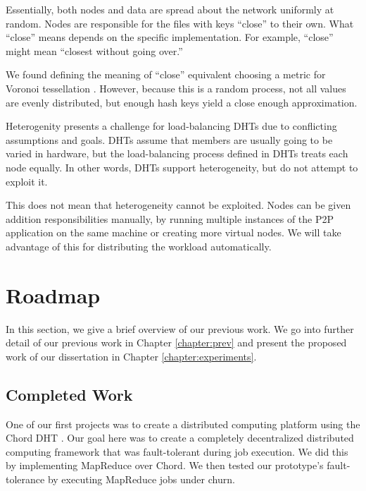 Essentially, both nodes and data are spread about the network uniformly at random.
Nodes are responsible for the files with keys ``close'' to their own.
What ``close'' means depends on the specific implementation.
For example, ``close'' might mean ``closest without going over.''
 
We found defining the meaning of ``close'' equivalent choosing a metric for Voronoi tessellation \cite{vhash}.
However, because this is a random process, not all values are evenly distributed, but enough hash keys yield a close enough approximation.

Heterogenity presents a challenge for load-balancing DHTs due to conflicting assumptions and goals. 
DHTs assume that members are usually going to be varied in hardware, but the load-balancing process defined in DHTs treats each node equally.
In other words, DHTs support heterogeneity, but do not attempt to exploit it.

This does not mean that heterogeneity cannot be exploited.
Nodes can be given addition responsibilities manually, by running multiple instances of the P2P application on the same machine or creating more virtual nodes.
We will take advantage of this for distributing the workload automatically.



\section{Roadmap}

In this section, we give a brief overview of our previous work.
We go into further detail of our previous work in Chapter \ref{chapter:prev} and present the proposed work of our dissertation in Chapter \ref{chapter:experiments}. 
\subsection{Completed Work}

One of our first projects was to create a distributed computing platform using the Chord DHT \cite{chordreduce}.
Our goal here was to create a completely decentralized distributed computing framework that was fault-tolerant during job execution.
We did this by implementing MapReduce over Chord.
We then tested our prototype's fault-tolerance by executing MapReduce jobs under churn.

